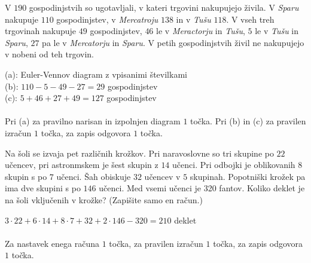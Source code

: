 \documentclass[addpoints,12pt]{exam}
\begin{document}
\begin{questions}
\newpage
    \question
    V $190$ gospodinjstvih so ugotavljali, v kateri trgovini nakupujejo živila. V \textit{Sparu} nakupuje $110$ gospodinjstev, v \textit{Mercatroju} $138$ in v \textit{Tušu} $118$.
    V vseh treh trgovinah nakupuje $49$ gospodinjstev, $46$ le v \textit{Meractorju} in \textit{Tušu}, $5$ le v \textit{Tušu} in \textit{Sparu}, $27$ pa le v \textit{Mercatorju} in \textit{Sparu}. 
    V petih gospodinjstvih živil ne nakupujejo v nobeni od teh trgovin.

    \begin{solution}[8cm]
        (a): Euler-Vennov diagram z vpisanimi številkami \\
        (b): $110-5-49-27=29$ gospodinjstev\\
        (c): $5+46+27+49=127$ gospodinjstev \\ \\
        Pri (a) za pravilno narisan in izpolnjen diagram $1$ točka. Pri (b) in (c) za pravilen izračun $1$ točka, za zapis odgovora $1$ točka.
    \end{solution}




    \newpage
        

    \question[3]
    Na šoli se izvaja pet različnih krožkov. Pri naravoslovne so tri skupine po $22$ učencev, pri astronmskem je šest skupin z $14$ učenci. Pri odbojki je oblikovanih $8$ skupin s po $7$ učenci. Šah obiskuje $32$ učencev v $5$ skupinah. Popotniški krožek pa ima dve skupini s po $146$ učenci.
    Med vsemi učenci je 320 fantov. Koliko deklet je na šoli vključenih v krožke? (Zapišite samo en račun.)

    \begin{solution}[9cm]
        $3\cdot 22+6\cdot 14+8\cdot 7+32+2\cdot 146-320=210$ deklet \\ \\
        Za nastavek enega računa $1$ točka, za pravilen izračun $1$ točka, za zapis odgovora $1$ točka.
    \end{solution}


\end{questions}
\end{document}
